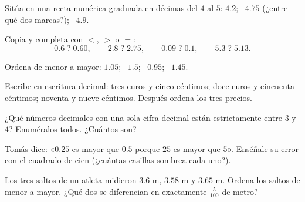 \begin{exercise}[$\star$]\label{exo:g4:decimals:5}
Sitúa en una recta numérica graduada en décimas del $4$ al $5$:
$4.2$; \ $4.75$ (¿entre qué dos marcas?); \ $4.9$.
\end{exercise}

\begin{exercise}[$\star$]\label{exo:g4:decimals:6}
Copia y completa con $<$, $>$ o $=$:
\[
0.6 \;?\; 0.60, \qquad
2.8 \;?\; 2.75, \qquad
0.09 \;?\; 0.1, \qquad
5.3 \;?\; 5.13 .
\]
\end{exercise}

\begin{exercise}[$\star$]\label{exo:g4:decimals:7}
Ordena de menor a mayor: $1.05$; \ $1.5$; \ $0.95$; \ $1.45$.
\end{exercise}

\begin{exercise}[$\star$]\label{exo:g4:decimals:8}
Escribe en escritura decimal: tres euros y cinco céntimos; doce euros
y cincuenta céntimos; noventa y nueve céntimos. Después ordena los tres precios.
\end{exercise}

\begin{exercise}[$\star$]\label{exo:g4:decimals:9}
¿Qué números decimales con una sola cifra decimal están estrictamente entre
$3$ y $4$? Enuméralos todos. ¿Cuántos son?
\end{exercise}

\begin{exercise}[$\star\star$]\label{exo:g4:decimals:10}
Tomás dice: «$0.25$ es mayor que $0.5$ porque $25$ es mayor que
$5$». Enséñale su error con el cuadrado de cien (¿cuántas casillas
sombrea cada uno?).
\end{exercise}

\begin{exercise}[$\star\star$]\label{exo:g4:decimals:11}
Los tres saltos de un atleta midieron $3.6$ m, $3.58$ m y $3.65$ m.
Ordena los saltos de menor a mayor. ¿Qué dos se diferencian en
exactamente $\frac{5}{100}$ de metro?
\end{exercise}
